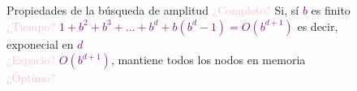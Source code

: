     \begin{frame}{Propiedades de la búsqueda de amplitud}
        \textcolor{Pink}{¿Completo?} Si, sí \textcolor{Purple}{$b$} es finito \\
        \textcolor{Pink}{¿Tiempo?} \textcolor{Purple}{$1+b^2+b^3+...+b^d+b(b^d-1)=O(b^{d+1})$} es decir,\\    \hspace{9.3cm} exponecial en \textcolor{Purple}{$d$} \\
        \textcolor{Pink}{¿Espacio?} \textcolor{Purple}{$O(b^{d+1})$}, mantiene todos los nodos en memoria \\
        \textcolor{Pink}{¿Óptimo?}
    \end{frame}
